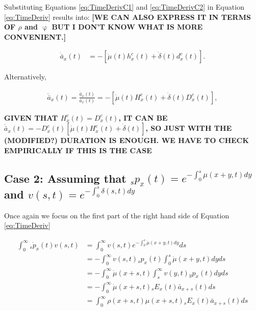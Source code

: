 \documentclass[12pt]{article}
\begin{document}
Substituting Equations \ref{eq:TimeDerivC1} and \ref{eq:TimeDerivC2} in Equation \ref{eq:TimeDeriv} results into: \textbf{[WE CAN ALSO EXPRESS IT IN TERMS OF $\rho$ and $\upvarphi$ BUT I DON'T KNOW WHAT IS MORE CONVENIENT.]}

\begin{equation}\label{eq:TimeDerivC}
\begin{split}
\dot{\bar{a}} _x(t)&=-[\dot{\mu}(t)  h^{c}_x(t)+\dot{\delta}(t)  d^{c}_x(t)].
\end{split}
\end{equation}

Alternatively,


\begin{equation}\label{eq:TimeDerivCA}
\begin{split}
\acute{\bar{a}}_x(t) =\frac{\dot{\bar{a}}_x(t)}{\bar{a}_x(t)}= -[\dot{\mu}(t) H^{c}_x(t)+\dot{\delta}(t)  D^{c}_x(t)],
\end{split}
\end{equation}



\textbf{GIVEN THAT $H^{c}_x(t)=D^{c}_x(t)$, IT CAN BE $\acute{\bar{a}}_x(t) = -D^{c}_x(t)[\dot{\mu}(t) H^{c}_x(t)+\dot{\delta}(t)]$, SO JUST WITH THE (MODIFIED?) DURATION IS ENOUGH. WE HAVE TO CHECK EMPIRICALLY IF THIS IS THE CASE}

\subsection{Case 2: Assuming that $_sp_x(t)=e^{-\int_{0}^{s}\mu(x+y,t)dy}$ and  ${v}(s,t)=e^{-\int_{0}^{s}\delta(s,t)dy}$}

Once again we focus on the first part of the right hand side of Equation \ref{eq:TimeDeriv}

\begin{equation}\label{eq:TimeDerivP1}
\begin{split}
\int_0^\infty {}_s\dot{p}_x(t) v(s,t) &= \int_0^\infty   v(s,t) e^{-\int_0^{s}\dot{\mu}(x+y,t)dy}ds\\
&= -\int_0^\infty   v(s,t) {}_sp_x(t)\int_0^{s}\dot{\mu}(x+y,t)dyds\\
&= -\int_0^\infty  \dot{\mu}(x+s,t) \int_s^{\infty} v(y,t) {}_yp_x(t) dyds\\
&= - \int_0^\infty \dot{\mu}(x+s,t)   {}_sE_x(t) \bar{a} _{x+s}(t) ds\\
&= \int_0^\infty \rho(x+s,t) \mu(x+s,t)   {}_sE_x(t) \bar{a} _{x+s}(t) ds\\
\end{split}
\end{equation}
\end{document}
